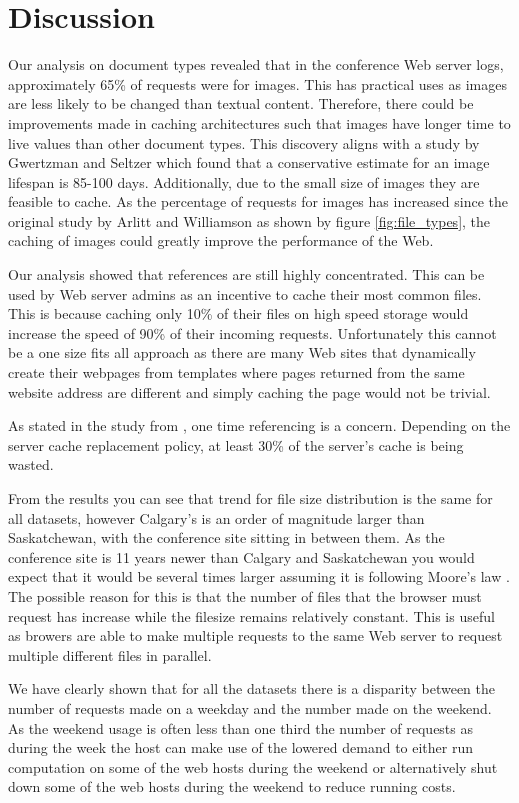 \documentclass[10pt,conference]{IEEEtran}
\begin{document}
\section{Discussion}\label{discussion}
Our analysis on document types revealed that in the conference Web server logs, approximately 65\% of requests were for images. This has practical uses as images are less likely to be changed than textual content. Therefore, there could be improvements made in caching architectures such that images have longer time to live values than other document types. This discovery aligns with a study by Gwertzman and Seltzer \cite{Gwertzman} which found that a conservative estimate for an image lifespan is 85-100 days. Additionally, due to the small size of images they are feasible to cache. As the percentage of requests for images has increased since the original study by Arlitt and Williamson \cite{invariants} as shown by figure \ref{fig:file_types}, the caching of images could greatly improve the performance of the Web.

Our analysis showed that references are still highly concentrated. This can be used by Web server admins as an incentive to cache their most common files. This is because caching only 10\% of their files on high speed storage would increase the speed of 90\% of their incoming requests. Unfortunately this cannot be a one size fits all approach as there are many Web sites that dynamically create their webpages from templates where pages returned from the same website address are different and simply caching the page would not be trivial.

As stated in the study from \cite{invariants}, one time referencing is a concern. Depending on the server cache replacement policy, at least 30\% of the server's cache is being wasted. 

From the results you can see that trend for file size distribution is the same for all datasets, however Calgary's is an order of magnitude larger than Saskatchewan, with the conference site sitting in between them. As the conference site is 11 years newer than Calgary and Saskatchewan you would expect that it would be several times larger assuming it is following Moore's law \cite{williams05}. The possible reason for this is that the number of files that the browser must request has increase while the filesize remains relatively constant. This is useful as browers are able to make multiple requests to the same Web server to request multiple different files in parallel.

We have clearly shown that for all the datasets there is a disparity between the number of requests made on a weekday and the number made on the weekend. As the weekend usage is often less than one third the number of requests as during the week the host can make use of the lowered demand to either run computation on some of the web hosts during the weekend or alternatively shut down some of the web hosts during the weekend to reduce running costs.
\end{document}
